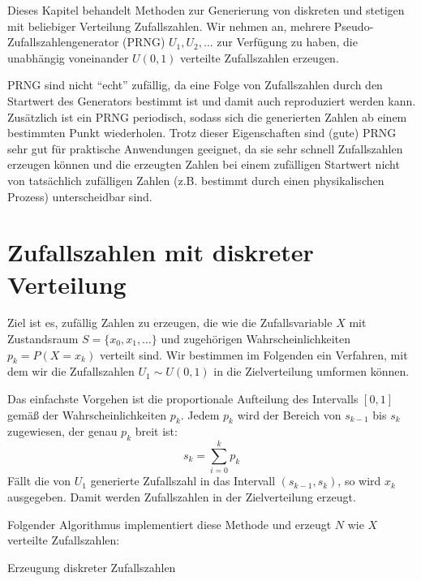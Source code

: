 Dieses Kapitel behandelt Methoden zur Generierung von diskreten und stetigen
mit beliebiger Verteilung Zufallszahlen. Wir nehmen an, mehrere
Pseudo-Zufallszahlengenerator (PRNG) $U_1, U_2, \ldots$ zur Verfügung zu haben,
die unabhängig voneinander $U(0,1)$ verteilte Zufallszahlen erzeugen.

PRNG sind nicht "`echt"' zufällig, da eine Folge von Zufallszahlen durch den
Startwert des Generators bestimmt ist und damit auch reproduziert werden kann.
Zusätzlich ist ein PRNG periodisch, sodass sich die generierten Zahlen ab einem
bestimmten Punkt wiederholen. Trotz dieser Eigenschaften sind (gute) PRNG sehr
gut für praktische Anwendungen geeignet, da sie sehr schnell Zufallszahlen
erzeugen können und die erzeugten Zahlen bei einem zufälligen Startwert nicht
von tatsächlich zufälligen Zahlen (z.B. bestimmt durch einen physikalischen
Prozess) unterscheidbar sind.

\section{Zufallszahlen mit diskreter Verteilung}

Ziel ist es, zufällig Zahlen zu erzeugen, die wie die Zufallsvariable $X$ mit
Zustandsraum $S = \{x_0, x_1, \ldots\}$ und zugehörigen Wahrscheinlichkeiten
$p_k = P(X=x_k)$ verteilt sind. Wir bestimmen im Folgenden ein Verfahren, mit
dem wir die Zufallszahlen $U_1\sim U(0,1)$ in die Zielverteilung umformen
können.

Das einfachste Vorgehen ist die proportionale Aufteilung des Intervalls $[0,1]$
gemäß der Wahrscheinlichkeiten $p_k$. Jedem $p_k$ wird der Bereich von $s_{k-1}$
bis $s_k$ zugewiesen, der genau $p_k$ breit ist:
\[
s_{k} = \sum_{i=0}^k p_k
\]
Fällt die von $U_1$ generierte Zufallszahl in das Intervall $(s_{k-1}, s_k)$, so
wird $x_k$ ausgegeben. Damit werden Zufallszahlen in der Zielverteilung erzeugt.

Folgender Algorithmus implementiert diese Methode und erzeugt $N$ wie $X$
verteilte Zufallszahlen:

\begin{algorithm}[h!]


\caption{Erzeugung diskreter Zufallszahlen}\label{algo:zz-diskret}
\end{algorithm}

